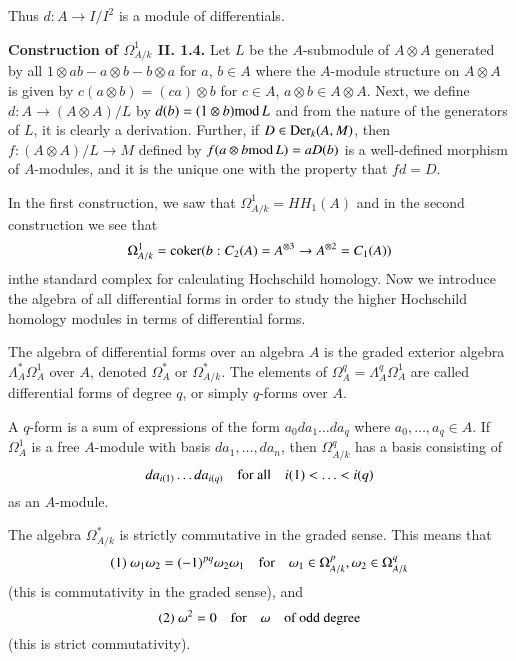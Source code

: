 Thus $d:A\to I/I^{2}$ is a module of differentials.

\medskip
\noindent
{\bf Construction of {\boldmath$\Omega^{1}_{A/k}$} II. 1.4.}
Let $L$ be the $A$-submodule of $A\otimes A$ generated by all
$1\otimes ab-a\otimes b-b\otimes a$ for $a$, $b\in A$ where the
$A$-module structure on $A\otimes A$ is given by $c(a\otimes
b)=(ca)\otimes b$ for $c\in A$, $a\otimes b\in A\otimes A$. Next, we
define $d:A\to (A\otimes A)/L$ by $d(b)=(1\otimes b)\text{mod\,}L$ and
from the nature of the generators of $L$, it is clearly a
derivation. Further, if $D\in \operatorname{Der}_{k}(A,M)$, then $f:(A\otimes
A)/L\to M$ defined by $f(a\otimes b\text{mod\,}L)=aD(b)$ is a
well-defined morphism of $A$-modules, and it is the unique one with
the property that $fd=D$.

\setcounter{theorem}{4}
\begin{remark}\label{chap6-rem1.5}
In the first construction, we saw that $\Omega^{1}_{A/k}=HH_{1}(A)$
and in the second construction we see that
$$
\Omega^{1}_{A/k}=\operatorname{coker}(b:C_{2}(A)=A^{\otimes 3}\to A^{\otimes
  2}=C_{1}(A))
$$
in\pageoriginale the standard complex for calculating Hochschild
homology. Now we introduce the algebra of all differential forms in
order to study the higher Hochschild homology modules in terms of
differential forms.
\end{remark}

\begin{definition}\label{chap6-defi1.6}
The algebra of differential forms over an algebra $A$ is the graded
exterior algebra $\Lambda^{*}_{A}\Omega^{1}_{A}$ over $A$, denoted
$\Omega^{*}_{A}$ or $\Omega^{*}_{A/k}$. The elements of
$\Omega^{q}_{A}=\Lambda^{q}_{A}\Omega^{1}_{A}$ are called differential
forms of degree $q$, or simply $q$-forms over $A$.
\end{definition}

A $q$-form is a sum of expressions of the form $a_{0}da_{1}\ldots
da_{q}$ where $a_{0},\ldots,a_{q}\in A$. If $\Omega^{1}_{A}$ is a free
$A$-module with basis $da_{1},\ldots,da_{n}$, then $\Omega^{q}_{A/k}$
has a basis consisting of
$$
da_{i(1)}\ldots da_{i(q)}\quad\text{for all}\quad i(1)<\ldots<i(q)
$$
as an $A$-module.

\begin{remark}\label{chap6-rem1.7}
The algebra $\Omega^{*}_{A/k}$ is strictly commutative in the graded
sense. This means that
$$
(1)~ \omega_{1}\omega_{2}=(-1)^{pq}\omega_{2}\omega_{1}\quad\text{for}\quad
\omega_{1}\in \Omega^{p}_{A/k},\omega_{2}\in \Omega^{q}_{A/k} 
$$
(this is commutativity in the graded sense), and
$$
(2)~ \omega^{2}=0\quad\text{for}\quad \omega\quad\text{of odd degree}
$$
(this is strict commutativity).
\end{remark}

